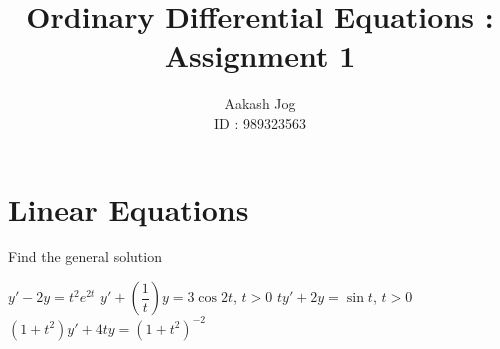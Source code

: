 \documentclass[fleqn, a4paper, 12pt, oneside]{amsart}
\title{Ordinary Differential Equations : Assignment 1}
\author
{
	Aakash Jog\\
	ID : 989323563
}
\date{\formatdate{30}{3}{2015}}
\theoremstyle{definition}
\theoremstyle{theorem}
\begin{document}
	
\maketitle

\part{Linear Equations}

\begin{question}
	Find the general solution
	\begin{tasks}
		\task $y' - 2y = t^2 e^{2t}$
		\task $y' + \left( \dfrac{1}{t} \right) y = 3 \cos 2t$, $t > 0$
		\task $t y' + 2y = \sin t$, $t > 0$
		\task $(1 + t^2) y' + 4 t y = (1 + t^2)^{-2}$
	\end{tasks}
\end{question}
\end{document}
